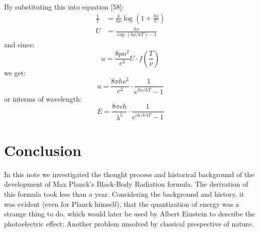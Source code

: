\documentclass[9pt,a4paper, twocolumn]{article}
\begin{document}
            By substituting this into equation [58]:
            \begin{align}
                \frac1T &= \frac{k}{h\nu}\log\left(1+\frac {h\nu}{U}\right)\\
                U &= \frac{h\nu}{\exp(h\nu/kT) - 1}
            \end{align}
            and since:
            $$
            u = \frac{8pn^2}{c^3}U\cdot f\left(\frac{T}{\nu}\right)
            $$
            we get:
            \begin{equation}
                \boxed{u = \frac{8\pi h\nu^3}{c^3}\cdot \frac{1}{e^{h\nu/kT}- 1}}
            \end{equation}
            or interms of wavelength:
            \begin{equation}
                \boxed{
                    E = \frac{8\pi ch}{\lambda^5}\cdot \frac{1}{e^{ch/k\lambda T}-1}
                }
            \end{equation}
    \section{Conclusion}
        In this note we investigated the thought process and historical background of the development of Max Planck's Black-Body Radiation formula. The derivation of this formula took less than a year. Considering the background and history, it was evident (even for Planck himself), that the quantization of energy was a strange thing to do, which would later be used by Albert Einstein to describe the photoelectric effect; Another problem unsolved by classical prespective of nature.




{}

\nocite {*}
\end{document}
